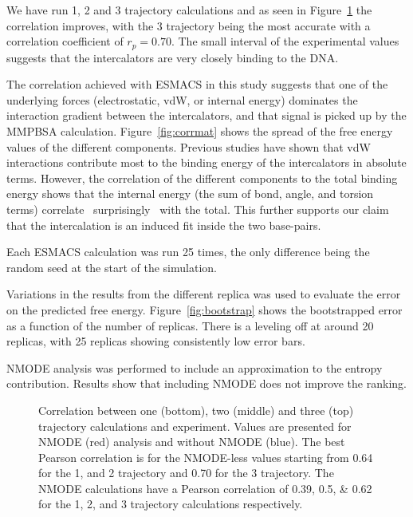 
We have run 1, 2 and 3 trajectory calculations and as seen in Figure~\ref{fig:mmpbsa} the correlation improves, with the 3 trajectory being the most accurate with a correlation coefficient of $r_p=0.70$. The small interval of the experimental values suggests that the intercalators are very closely binding to the DNA. 


The correlation achieved with ESMACS in this study suggests that one of the underlying forces (electrostatic, vdW, or internal energy) dominates the interaction gradient between the intercalators, and that signal is picked up by the MMPBSA calculation. Figure~\ref{fig:corrmat} shows the spread of the free energy values of the different components. Previous studies \cite{} have shown that vdW interactions contribute most to the binding energy of the intercalators in absolute terms. However, the correlation of the different components to the total binding energy shows that the internal energy (the sum of bond, angle, and torsion terms) correlate ~surprisingly~ with the total. 
This further supports our claim that the intercalation is an induced fit inside the two base-pairs.

Each ESMACS calculation was run 25 times, the only difference being the random seed at the start of the simulation. 

Variations in the results from the different replica was used to evaluate the error on the predicted free energy. Figure~\ref{fig:bootstrap} shows the bootstrapped error as a function of the number of replicas. There is a leveling off at around 20 replicas, with 25 replicas showing consistently low error bars.

NMODE analysis was performed to include an approximation to the entropy contribution. Results show that including NMODE does not improve the ranking. 



\begin{figure}[h!]
	
	\caption{Correlation between one (bottom), two (middle) and three (top) trajectory calculations and experiment. Values are presented for NMODE (red) analysis and without NMODE (blue). The best Pearson correlation is for the NMODE-less values starting from \num{0.64} for the 1, and 2 trajectory and \num{0.70} for the 3 trajectory. The NMODE calculations have a Pearson correlation of \numlist{0.39; 0.5; 0.62} for the 1, 2, and 3 trajectory calculations respectively.}
	\label{fig:mmpbsa}
\end{figure}
